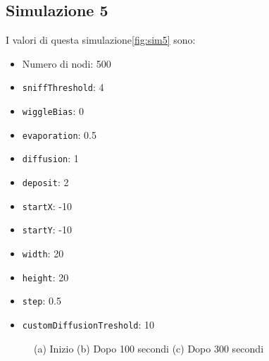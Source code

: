 \subsection{Simulazione 5}
I valori di questa simulazione\space \cref{fig:sim5} sono:
\begin{itemize}
    \item Numero di nodi: 500
    \item \texttt{sniffThreshold}: 4
    \item \texttt{wiggleBias}: 0
    \item \texttt{evaporation}: 0.5
    \item \texttt{diffusion}: 1
    \item \texttt{deposit}: 2
    \item \texttt{startX}: -10
    \item \texttt{startY}: -10
    \item \texttt{width}: 20
    \item \texttt{height}: 20
    \item \texttt{step}: 0.5
    \item \texttt{customDiffusionTreshold}: 10
\end{itemize}
\begin{figure}[ht]
    \centering
    \caption{(a) Inizio (b) Dopo 100 secondi (c) Dopo 300 secondi}\label{fig:sim1}
\end{figure}
